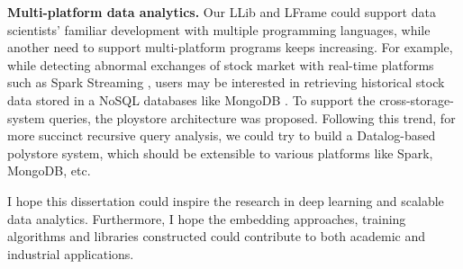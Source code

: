 \documentclass [PhD] {uclathes}
\begin{document}
\textbf{Multi-platform data analytics.}  Our LLib and LFrame could support data scientists' familiar development with multiple programming languages, while another need to support multi-platform programs keeps increasing. For example, while detecting abnormal exchanges of stock market with real-time platforms such as Spark Streaming \citep{zaharia2013discretized}, users may be interested in retrieving historical stock data stored in a NoSQL databases like MongoDB \citep{chodorow2013mongodb}. To support the cross-storage-system queries, the ploystore \citep{duggan2015bigdawg} architecture was proposed. Following this trend, for more succinct recursive query analysis, we could try to build a Datalog-based polystore system, which should be extensible to various platforms like Spark, MongoDB, etc.

I hope this dissertation could inspire the research in deep learning and scalable  data analytics. Furthermore, I hope the embedding approaches, training algorithms and libraries constructed could contribute to both academic and industrial applications. 




{}


\end{document}

